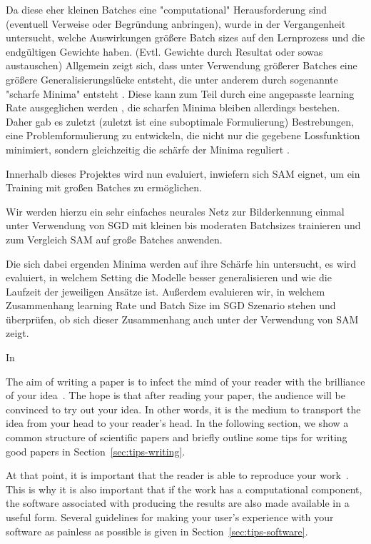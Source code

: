 \documentclass[10pt,conference,compsocconf]{IEEEtran}
\begin{document}
Da diese eher kleinen Batches eine "computational" Herausforderung sind (eventuell Verweise oder Begründung anbringen), wurde in der Vergangenheit untersucht, welche Auswirkungen größere Batch sizes auf den Lernprozess und die endgültigen Gewichte haben. (Evtl. Gewichte durch Resultat oder sowas austauschen) 
Allgemein zeigt sich, dass unter Verwendung größerer Batches eine größere Generalisierungslücke entsteht, die unter anderem durch sogenannte "scharfe Minima" entsteht \cite{keskar2017largebatch}. Diese kann zum Teil durch eine angepasste learning Rate ausgeglichen werden \cite{goyal2018accurate}, die scharfen Minima bleiben allerdings bestehen. 
Daher gab es zuletzt (zuletzt ist eine suboptimale Formulierung) Bestrebungen, eine Problemformulierung zu entwickeln, die nicht nur die gegebene Lossfunktion minimiert, sondern gleichzeitig die schärfe der Minima reguliert \cite{foret2021sharpnessaware}. 

Innerhalb dieses Projektes wird nun evaluiert, inwiefern sich SAM eignet, um ein Training mit großen Batches zu ermöglichen. 

Wir werden hierzu ein sehr einfaches neurales Netz zur Bilderkennung einmal unter Verwendung von SGD mit kleinen bis moderaten Batchsizes trainieren und zum Vergleich SAM auf große Batches anwenden. 

Die sich dabei ergenden Minima werden auf ihre Schärfe hin untersucht, es wird evaluiert, in welchem Setting die Modelle besser generalisieren und wie die Laufzeit der jeweiligen Ansätze ist. 
Außerdem evaluieren wir, in welchem Zusammenhang learning Rate und Batch Size im SGD Szenario stehen und überprüfen, ob sich dieser Zusammenhang auch unter der Verwendung von SAM zeigt. 
 
In \cite{keskar2017largebatch}





The aim of writing a paper is to infect the mind of your reader with
the brilliance of your idea~\cite{jones08}. 
The hope is that after reading your
paper, the audience will be convinced to try out your idea. In other
words, it is the medium to transport the idea from your head to your
reader's head. 
In the following
section, we show a common structure of scientific papers and briefly
outline some tips for writing good papers in
Section~\ref{sec:tips-writing}.

At that
point, it is important that the reader is able to reproduce your
work~\cite{schwab00,wavelab,gentleman05}. This is why it is also
important that if the work has a computational component, the software
associated with producing the results are also made available in a
useful form. Several guidelines for making your user's experience with
your software as painless as possible is given in
Section~\ref{sec:tips-software}.
\end{document}
